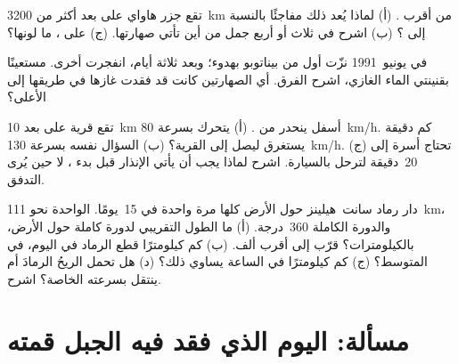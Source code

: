 \begin{exercise}[$\star\star$]\label{exo:g7:volcanoes:9}
تقع جزر هاواي على بعد أكثر من \qty{3200}{km} من أقرب . (أ) لماذا يُعد ذلك مفاجئًا بالنسبة إلى ؟ (ب) اشرح في ثلاث أو
أربع جمل من أين تأتي صهارتها. (ج) على 
، ما لونها؟
\end{exercise}

\begin{exercise}[$\star\star$]\label{exo:g7:volcanoes:10}
في يونيو~1991 نزّت أول  من بيناتوبو بهدوء؛ وبعد ثلاثة أيام،
انفجرت  أخرى. مستعينًا بقنينتي الماء الغازي، اشرح
الفرق. أي الصهارتين كانت قد فقدت غازها في طريقها إلى الأعلى؟
\end{exercise}

\begin{exercise}[$\star\star\star$]\label{exo:g7:volcanoes:11}
تقع قرية على بعد \qty{10}{km} أسفل  ينحدر من . (أ)
يتحرك  بسرعة \qty{80}{km/h}. كم دقيقة يستغرق
ليصل إلى القرية؟ (ب) السؤال نفسه بسرعة \qty{130}{km/h}. (ج) تحتاج أسرة
إلى 20~دقيقة لترحل بالسيارة. اشرح لماذا يجب أن يأتي الإنذار
قبل بدء ، لا حين يُرى التدفق.
\end{exercise}

\begin{exercise}[$\star\star\star$]\label{exo:g7:volcanoes:12}
دار رماد  سانت~هيلينز حول الأرض كلها مرة واحدة في 15~يومًا.
 الواحدة نحو \qty{111}{km}، والدورة الكاملة
360~درجة. (أ) ما الطول التقريبي لدورة كاملة حول الأرض، بالكيلومترات؟
قرّب إلى أقرب ألف. (ب) كم كيلومترًا قطع
الرماد في اليوم، في المتوسط؟ (ج) كم كيلومترًا في الساعة يساوي
ذلك؟ (د) هل تحمل الريحُ الرمادَ أم ينتقل بسرعته الخاصة؟ اشرح.
\end{exercise}

\section{مسألة: اليوم الذي فقد فيه الجبل قمته}

